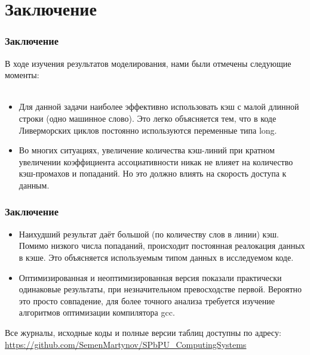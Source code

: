 \documentclass{beamer}
\begin{document}
\section{Заключение}

\begin{frame}
\frametitle{Заключение}

В ходе изучения результатов моделирования, нами были отмечены
следующие моменты:\\~\\

\begin{itemize}
\item Для данной задачи наиболее эффективно использовать кэш с малой длинной строки (одно машинное слово). Это легко объясняется тем, что в коде Ливерморских циклов постоянно используются переменные типа long.
\item Во многих ситуациях, увеличение количества кэш-линий при кратном увеличении коэффициента ассоциативности никак не влияет на количество кэш-промахов и попаданий. Но это должно влиять на скорость доступа к данным.
\end{itemize}


\end{frame}


\begin{frame}
\frametitle{Заключение}

\begin{itemize}
\item Наихудший результат даёт большой (по количеству слов в линии) кэш. Помимо низкого числа попаданий, происходит постоянная реалокация данных в кэше. Это объясняется используемым типом данных в исследуемом коде.
\item Оптимизированная и неоптимизированная версия показали практически одинаковые результаты, при незначительном превосходстве первой. Вероятно это просто совпадение, для более точного анализа требуется изучение алгоритмов оптимизации компилятора gcc.
\end{itemize}

Все журналы, исходные коды и полные версии таблиц доступны по адресу: \url{https://github.com/SemenMartynov/SPbPU_ComputingSystems}

\end{frame}

\end{document}
